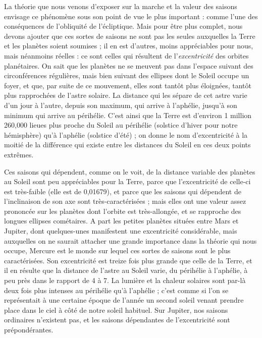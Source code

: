 \documentclass[a4paper, 11pt, oneside, landscape]{article}
\begin{document}
La théorie que nous venons d'exposer sur la marche et la valeur des saisons envisage ce phénomène sous son point de vue le plus important : comme l'une des conséquences de l'obliquité de l'écliptique. Mais pour être plus complet, nous devons ajouter que ces sortes de saisons ne sont pas les seules auxquelles la Terre et les planètes soient soumises ; il en est d'autres, moins appréciables pour nous, mais néanmoins réelles : ce sont celles qui résultent de l'\emph{excentricité} des orbites planétaires. On sait que les planètes ne se meuvent pas dans l'espace suivant des circonférences régulières, mais bien suivant des ellipses dont le Soleil occupe un foyer, et que, par suite de ce mouvement, elles sont tantôt plus éloignées, tantôt plus rapprochées de l'astre solaire. La distance qui les sépare de cet astre varie d'un jour à l'autre, depuis son maximum, qui arrive à l'aphélie, jusqu'à son minimum qui arrive au périhélie. C'est ainsi que la Terre est d'environ 1 million 260,000 lieues plus proche du Soleil au périhélie (solstice d'hiver pour notre hémisphère) qu'à l'aphélie (solstice d'été) ; on donne le nom d'excentricité à la moitié de la différence qui existe entre les distances du Soleil en ces deux points extrêmes.

Ces saisons qui dépendent, comme on le voit, de la distance variable des planètes au Soleil sont peu appréciables pour la Terre, parce que l'excentricité de celle-ci est très-faible (elle est de 0,01679), et parce que les saisons qui dépendent de l'inclinaison de son axe sont très-caractérisées ; mais elles ont une valeur assez prononcée sur les planètes dont l'orbite est très-allongée, et se rapproche des longues ellipses cométaires. A part les petites planètes situées entre Mars et Jupiter, dont quelques-unes manifestent une excentricité considérable, mais auxquelles on ne saurait attacher une grande importance dans la théorie qui nous occupe, Mercure est le monde sur lequel ces sortes de saisons sont le plus caractérisées. Son excentricité est treize fois plus grande que celle de la Terre, et il en résulte que la distance de l'astre au Soleil varie, du périhélie à l'aphélie, à peu près dans le rapport de 4 à 7. La lumière et la chaleur solaires sont par-là deux fois plus intenses au périhélie qu'à l'aphélie ; c'est comme si l'on se représentait à une certaine époque de l'année un second soleil venant prendre place dans le ciel à côté de notre soleil habituel. Sur Jupiter, nos saisons ordinaires n'existent pas, et les saisons dépendantes de l'excentricité sont prépondérantes.
\end{document}
